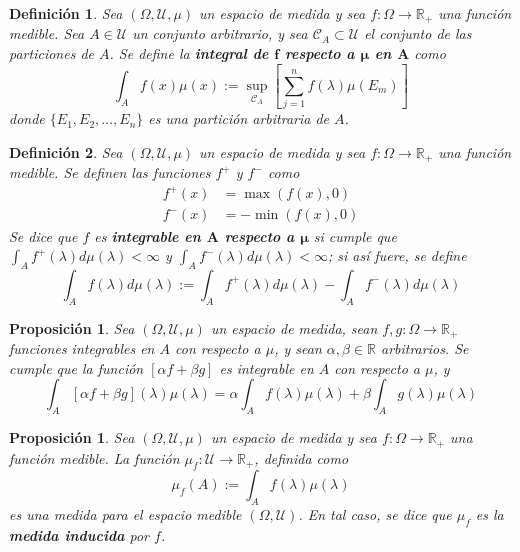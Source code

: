 \documentclass[12pt,letterpaper,draft]{book}
\newtheorem{definicion}{Definición}[chapter]
\newtheorem{proposicion}[teorema]{Proposición}
\newcommand{\R}{\mathbb{R}}
\begin{document}
\begin{definicion}
Sea $(\Omega, \mathcal{U}, \mu)$ un espacio de medida y sea $f:\Omega \rightarrow \R_+$ una función medible. Sea $A\in \mathcal{U}$ un conjunto arbitrario, y sea $\mathcal{C}_A \subset \mathcal{U}$ el conjunto de las particiones de $A$.
Se define la \textbf{integral de $\boldsymbol{f}$ respecto a $\boldsymbol{\mu}$ en $\boldsymbol{A}$} como
\begin{equation}
\int_A f(x) \mu(x) := \sup_{\mathcal{C}_A} \left[ \sum_{j=1}^{n} f(\lambda) \mu(E_m) \right]
\end{equation}
donde $\{ E_1, E_2, \dots, E_n \}$ es una partición arbitraria de $A$.
\end{definicion}

\begin{definicion}
Sea $(\Omega, \mathcal{U}, \mu)$ un espacio de medida y sea $f:\Omega \rightarrow \R_+$ una función medible. Se definen las funciones $f^{+}$ y $f^{-}$ como
\begin{align*}
f^{+}(x) &= \max (f(x), 0 ) \\
f^{-}(x) &= -\min (f(x), 0 )
\end{align*}
Se dice que $f$ es \textbf{integrable en $\boldsymbol{A}$ respecto a $\boldsymbol{\mu}$} si cumple que $\int_A f^{+}(\lambda) d\mu(\lambda) < \infty$ y $\int_A f^{-}(\lambda) d\mu(\lambda) < \infty$; si así fuere, se define
\begin{equation}
\int_A f(\lambda) d\mu(\lambda) := \int_A f^{+}(\lambda) d\mu(\lambda) - \int_A f^{-}(\lambda) d\mu(\lambda)
\end{equation}
\end{definicion}

\begin{proposicion}
Sea $(\Omega, \mathcal{U}, \mu)$ un espacio de medida, sean $f,g:\Omega \rightarrow \R_+$ funciones integrables en $A$ con respecto a $\mu$, y sean $\alpha, \beta \in \R$ arbitrarios. 
%
Se cumple que la función $[\alpha f + \beta g]$ es integrable en $A$ con respecto a $\mu$, y
\begin{equation}
\int_A \left[ \alpha f + \beta g \right] (\lambda) \mu(\lambda) = \alpha \int_A f(\lambda) \mu(\lambda) + \beta \int_A g(\lambda) \mu(\lambda)
\end{equation}
\end{proposicion}

\begin{proposicion}
Sea $(\Omega, \mathcal{U}, \mu)$ un espacio de medida y sea $f:\Omega \rightarrow \R_+$ una función medible. La función $\mu_f:\mathcal{U}\rightarrow\R_+$, definida como
\begin{equation}
\mu_f(A) := \int_A f(\lambda) \mu(\lambda)
\end{equation}
es una medida para el espacio medible $(\Omega, \mathcal{U})$. En tal caso, se dice que $\mu_f$ es la \textbf{medida inducida} por $f$.
\end{proposicion}
\end{document}
